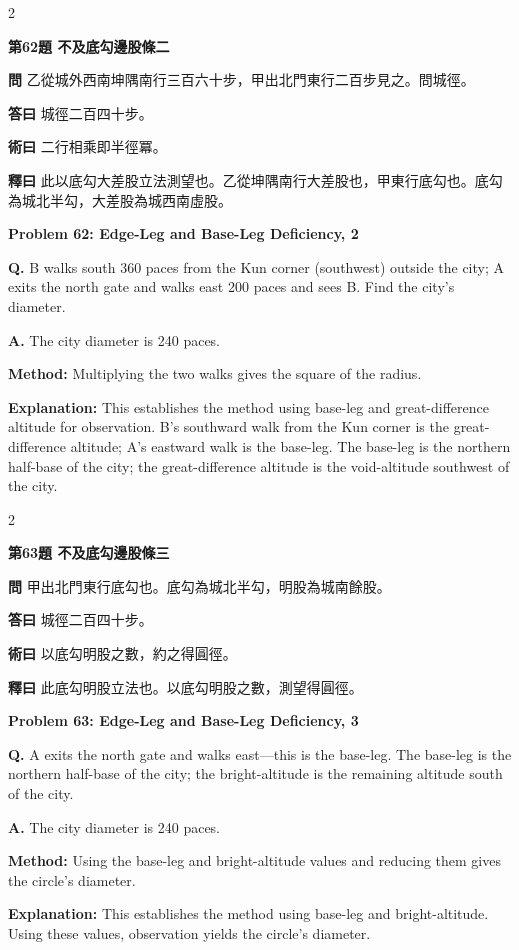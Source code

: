 \documentclass[11pt,a4paper]{article}
\newcommand{\wen}[1]{\noindent\textbf{問} #1\par\smallskip}
\newcommand{\da}[1]{\noindent\textbf{答曰} #1\par\smallskip}
\newcommand{\shu}[1]{\noindent\textbf{術曰} #1\par\smallskip}
\newcommand{\shi}[1]{\noindent\textbf{釋曰} #1\par\smallskip}
\newcommand{\wenE}[1]{\noindent\textbf{Q.} #1\par\smallskip}
\newcommand{\daE}[1]{\noindent\textbf{A.} #1\par\smallskip}
\newcommand{\shuE}[1]{\noindent\textbf{Method:} #1\par\smallskip}
\newcommand{\shiE}[1]{\noindent\textbf{Explanation:} #1\par\smallskip}
\begin{document}
\bigskip

\begin{paracol}{2}

\noindent\textbf{第62題 不及底勾邊股條二}

\wen{乙從城外西南坤隅南行三百六十步，甲出北門東行二百步見之。問城徑。}
\da{城徑二百四十步。}
\shu{二行相乘即半徑冪。}
\shi{此以底勾大差股立法測望也。乙從坤隅南行大差股也，甲東行底勾也。底勾為城北半勾，大差股為城西南虛股。}

\switchcolumn

\noindent\textbf{Problem 62: Edge-Leg and Base-Leg Deficiency, 2}

\wenE{B walks south 360 paces from the Kun corner (southwest) outside the city; A exits the north gate and walks east 200 paces and sees B. Find the city's diameter.}
\daE{The city diameter is 240 paces.}
\shuE{Multiplying the two walks gives the square of the radius.}
\shiE{This establishes the method using base-leg and great-difference altitude for observation. B's southward walk from the Kun corner is the great-difference altitude; A's eastward walk is the base-leg. The base-leg is the northern half-base of the city; the great-difference altitude is the void-altitude southwest of the city.}

\end{paracol}

\bigskip

\begin{paracol}{2}

\noindent\textbf{第63題 不及底勾邊股條三}

\wen{甲出北門東行底勾也。底勾為城北半勾，明股為城南餘股。}
\da{城徑二百四十步。}
\shu{以底勾明股之數，約之得圓徑。}
\shi{此底勾明股立法也。以底勾明股之數，測望得圓徑。}

\switchcolumn

\noindent\textbf{Problem 63: Edge-Leg and Base-Leg Deficiency, 3}

\wenE{A exits the north gate and walks east---this is the base-leg. The base-leg is the northern half-base of the city; the bright-altitude is the remaining altitude south of the city.}
\daE{The city diameter is 240 paces.}
\shuE{Using the base-leg and bright-altitude values and reducing them gives the circle's diameter.}
\shiE{This establishes the method using base-leg and bright-altitude. Using these values, observation yields the circle's diameter.}

\end{paracol}

\clearpage
\end{document}
